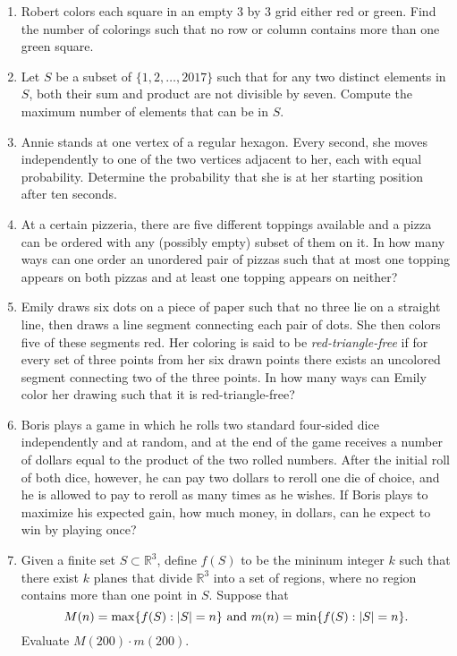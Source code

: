 \documentclass[10pt]{article}
\newcounter{enum}
\DeclarePairedDelimiter\abs{\lvert}{\rvert}
\begin{document}
\begin{enumerate}

\item Robert colors each square in an empty 3 by 3 grid either red or green. Find the number of colorings such that no row or column contains more than one green square.

\item Let $S$ be a subset of $\{1,2,\dots,2017\}$ such that for any two distinct elements in $S$, both their sum and product are not divisible by seven. Compute the maximum number of elements that can be in $S$.

\item Annie stands at one vertex of a regular hexagon. Every second, she moves independently to one of the two vertices adjacent to her, each with equal probability. Determine the probability that she is at her starting position after ten seconds.

\item At a certain pizzeria, there are five different toppings available and a pizza can be ordered with any (possibly empty) subset of them on it. In how many ways can one order an unordered pair of pizzas such that at most one topping appears on both pizzas and at least one topping appears on neither?

\item Emily draws six dots on a piece of paper such that no three lie on a straight line, then draws a line segment connecting each pair of dots. She then colors five of these segments red. Her coloring is said to be \emph{red-triangle-free} if for every set of three points from her six drawn points there exists an uncolored segment connecting two of the three points. In how many ways can Emily color her drawing such that it is red-triangle-free?

\item Boris plays a game in which he rolls two standard four-sided dice independently and at random, and at the end of the game receives a number of dollars equal to the product of the two rolled numbers. After the initial roll of both dice, however, he can pay two dollars to reroll one die of choice, and he is allowed to pay to reroll as many times as he wishes. If Boris plays to maximize his expected gain, how much money, in dollars, can he expect to win by playing once?

\item Given a finite set $S \subset \mathbb{R}^3$, define $f(S)$ to be the mininum integer $k$ such that there exist $k$ planes that divide $\mathbb{R}^3$ into a set of regions, where no region contains more than one point in $S$. Suppose that
\[M(n) = \max\{f(S) : \abs{S} = n\} \text{ and } m(n) = \min\{f(S) : \abs{S} = n\}.\]
Evaluate $M(200) \cdot m(200)$.


\end{enumerate}
\end{document}
